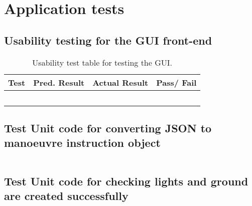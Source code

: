 \chapter{Application tests}

\section{Usability testing for the GUI front-end}
\begin{table}[h]
\begin{tabular}{|p{4.5cm}|p{3.5cm}|p{3.5cm}|l|}
\hline
\textbf{Test} & \textbf{Pred. Result} & \textbf{Actual Result} & \textbf{Pass/ Fail}                                                                                                    \\ \hline
    &    &            &     \\ \hline
    &    &            &     \\ \hline
    &    &            &     \\ \hline
    &    &            &     \\ \hline
    &    &            &     \\ \hline
\end{tabular}
\label{test:canvas}
\caption{Usability test table for testing the GUI.}
\end{table}

\section{Test Unit code for converting JSON to manoeuvre instruction object}
\label{test:jsonmvoes}
\begin{figure}[h!]
\caption{}
\begin{lstlisting}
\end{lstlisting}
\end{figure}

\section{Test Unit code for checking lights and ground are created successfully}
\label{test:lights}
\begin{figure}[h!]
\caption{}
\begin{lstlisting}
\end{lstlisting}
\end{figure}

